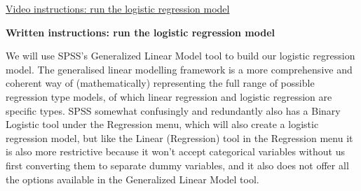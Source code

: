 \documentclass[
]{book}
\begin{document}
\href{https://youtu.be/e1IHf2dX_5U}{Video instructions: run the logistic regression model}

\textbf{Written instructions: run the logistic regression model}

We will use SPSS's Generalized Linear Model tool to build our logistic regression model. The generalised linear modelling framework is a more comprehensive and coherent way of (mathematically) representing the full range of possible regression type models, of which linear regression and logistic regression are specific types. SPSS somewhat confusingly and redundantly also has a Binary Logistic tool under the Regression menu, which will also create a logistic regression model, but like the Linear (Regression) tool in the Regression menu it is also more restrictive because it won't accept categorical variables without us first converting them to separate dummy variables, and it also does not offer all the options available in the Generalized Linear Model tool.
\end{document}

